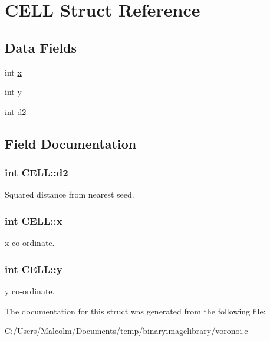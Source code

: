 \hypertarget{struct_c_e_l_l}{}\section{C\+E\+LL Struct Reference}
\label{struct_c_e_l_l}
\subsection*{Data Fields}
\begin{DoxyCompactItemize}
\item 
int \hyperlink{struct_c_e_l_l_a7ada1bd1b65cd4c6ec69fead0cdece9a}{x}
\item 
int \hyperlink{struct_c_e_l_l_a899af2d554b46953ccd3e644057959ff}{y}
\item 
int \hyperlink{struct_c_e_l_l_a825650dd404b200ba0916dd97c51f658}{d2}
\end{DoxyCompactItemize}


\subsection{Field Documentation}
\subsubsection[{\texorpdfstring{d2}{d2}}]{\setlength{\rightskip}{0pt plus 5cm}int C\+E\+L\+L\+::d2}\hypertarget{struct_c_e_l_l_a825650dd404b200ba0916dd97c51f658}{}\label{struct_c_e_l_l_a825650dd404b200ba0916dd97c51f658}
Squared distance from nearest seed. 
\subsubsection[{\texorpdfstring{x}{x}}]{\setlength{\rightskip}{0pt plus 5cm}int C\+E\+L\+L\+::x}\hypertarget{struct_c_e_l_l_a7ada1bd1b65cd4c6ec69fead0cdece9a}{}\label{struct_c_e_l_l_a7ada1bd1b65cd4c6ec69fead0cdece9a}
x co-\/ordinate. 
\subsubsection[{\texorpdfstring{y}{y}}]{\setlength{\rightskip}{0pt plus 5cm}int C\+E\+L\+L\+::y}\hypertarget{struct_c_e_l_l_a899af2d554b46953ccd3e644057959ff}{}\label{struct_c_e_l_l_a899af2d554b46953ccd3e644057959ff}
y co-\/ordinate. 

The documentation for this struct was generated from the following file\+:\begin{DoxyCompactItemize}
\item 
C\+:/\+Users/\+Malcolm/\+Documents/temp/binaryimagelibrary/\hyperlink{voronoi_8c}{voronoi.\+c}\end{DoxyCompactItemize}
